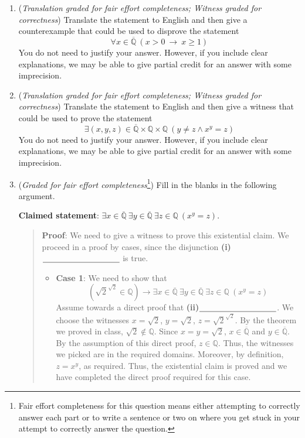 \begin{enumerate}
\begin{enumerate}
        \item ({\it Translation graded for fair effort completeness; Witness graded 
        for correctness}) Translate the statement to English and then give a counterexample 
        that could be used to disprove the statement
        \[
        \forall x \in \overline{\mathbb{Q}} ~\left(  x > 0 ~\to~ x \geq 1 \right)
        \]
        You do not need to justify your answer.  However, if you include clear explanations, 
        we may be able to give partial credit for an answer with some imprecision.
   
        \item ({\it Translation graded for fair effort completeness; Witness graded 
        for correctness}) Translate the statement to English and then give a witness that 
        could be used to prove the statement 
        \[
        \exists (x,y,z) \in \overline{\mathbb{Q}}\times\mathbb{Q}\times \mathbb{Q} ~(y \neq z \land x^ y= z)
        \]
        You do not need to justify your answer.  However, if you include clear explanations, 
        we may be able to give partial credit for an answer with some imprecision.
   
        \item ({\it Graded for fair effort completeness}\footnote{Fair effort completeness
        for this question means either attempting to correctly answer each part
        or to write a sentence or two on where you get stuck in your attempt to correctly answer
        the question.}) Fill in the blanks in the following argument.

        {\bf Claimed statement}: 
        $\exists x \in \overline{\mathbb{Q}}~ \exists y \in \overline{\mathbb{Q}} 
        ~\exists z\in \mathbb{Q} ~(x^y = z)$.
        
        \begin{quote}
        {\bf Proof}: We need to give a witness to prove this existential claim. 
        We proceed in a proof by cases, since the disjunction
        \textbf{(i)}$\underline{\phantom{\hspace{1.3in}}}$ is true.
        \begin{itemize}
        \item {\bf Case 1}: We need to show that 
        \[
            (\sqrt{2}^{\sqrt{2}} \in \mathbb{Q}) \to 
            \exists x \in \overline{\mathbb{Q}}~ \exists y \in \overline{\mathbb{Q}} 
            ~\exists z\in \mathbb{Q} ~(x^y = z)
        \]
        Assume towards a direct proof that \textbf{(ii)}$\underline{\phantom{\hspace{1.3in}}}$. We
        choose the witnesses $x = \sqrt{2}$, $y = \sqrt{2}$, $z = \sqrt{2}^{\sqrt{2}}$.  By the 
        theorem we proved in class, $\sqrt{2} \notin \mathbb{Q}$.
        Since $x = y = \sqrt{2}$, $x \in \overline{\mathbb{Q}}$ and  $y \in \overline{\mathbb{Q}}$.
        By the assumption of this direct proof, $z \in \mathbb{Q}$. Thus, the witnesses we picked
        are in the required domains.  Moreover, by definition, $z = x^y$, as required. Thus, the existential claim
        is proved and we have completed the direct proof required for this case.
   

\end{itemize}
\end{quote}
\end{enumerate}
\end{enumerate}
